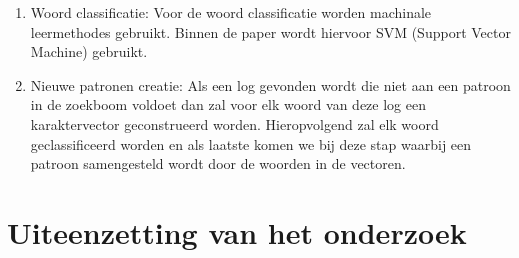 \begin{itemize}
\begin{enumerate}
        \item Woord classificatie: Voor de woord classificatie worden machinale leermethodes gebruikt. Binnen de paper wordt hiervoor SVM (Support Vector Machine) gebruikt.
        
        \item Nieuwe patronen creatie: Als een log gevonden wordt die niet aan een patroon in de zoekboom voldoet dan zal voor elk woord van deze log een karaktervector geconstrueerd worden. Hieropvolgend zal elk woord geclassificeerd worden en als laatste komen we bij deze stap waarbij een patroon samengesteld wordt door de woorden in de vectoren.
    \end{enumerate}
\end{itemize}

\section{Uiteenzetting van het onderzoek}

